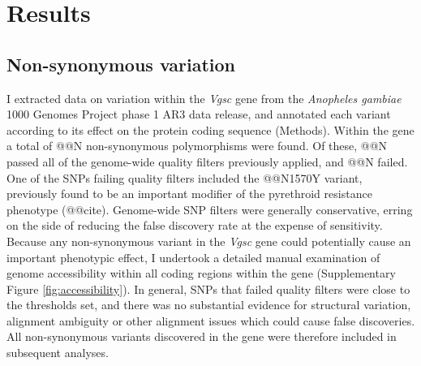 \documentclass[a4paper,11pt,abstracton,hidelinks]{scrartcl}
\newcommand{\vgsc}{\textit{Vgsc}\xspace}
\begin{document}
\section*{Results}


\subsection*{Non-synonymous variation}


%
I extracted data on variation within the \vgsc gene from the \textit{Anopheles gambiae} 1000 Genomes Project phase 1 AR3 data release, and annotated each variant according to its effect on the protein coding sequence (Methods).
%
Within the gene a total of @@N non-synonymous polymorphisms were found.
%
Of these, @@N passed all of the genome-wide quality filters previously applied, and @@N failed.
%
One of the SNPs failing quality filters included the @@N1570Y variant, previously found to be an important modifier of the pyrethroid resistance phenotype (@@cite).
%
Genome-wide SNP filters were generally conservative, erring on the side of reducing the false discovery rate at the expense of sensitivity.
%
Because any non-synonymous variant in the \vgsc gene could potentially cause an important phenotypic effect, I undertook a detailed manual examination of genome accessibility within all coding regions within the gene (Supplementary Figure \ref{fig:accessibility}).
%
In general, SNPs that failed quality filters were close to the thresholds set, and there was no substantial evidence for structural variation, alignment ambiguity or other alignment issues which could cause false discoveries.
%
All non-synonymous variants discovered in the gene were therefore included in subsequent analyses.
\end{document}
